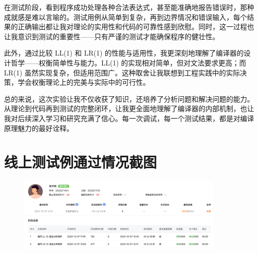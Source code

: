 在测试阶段，看到程序成功处理各种合法表达式，甚至能准确地报告错误时，那种成就感是难以言喻的。测试用例从简单到复杂，再到边界情况和错误输入，每个结果的正确输出都让我对理论的实用性和代码的可靠性感到欣慰。同时，这一过程也让我意识到测试的重要性——只有严谨的测试才能确保程序的健壮性。

此外，通过比较 LL(1) 和 LR(1) 的性能与适用性，我更深刻地理解了编译器的设计哲学——权衡简单性与能力。LL(1) 的实现相对简单，但对文法要求更高；而 LR(1) 虽然实现复杂，但适用范围广。这种取舍让我联想到工程实践中的实际决策，学会权衡理论上的完美与实际中的可行性。

总的来说，这次实验让我不仅收获了知识，还培养了分析问题和解决问题的能力。从理论到代码再到测试的完整闭环，让我更全面地理解了编译器的内部机制，也让我对后续深入学习和研究充满了信心。每一次调试，每一个测试结果，都是对编译原理魅力的最好诠释。

\appendix

\section{线上测试例通过情况截图}

\begin{figure}[htbp]
    \centering
    \includegraphics[width=0.9\textwidth]{images/pass.png}
\end{figure}